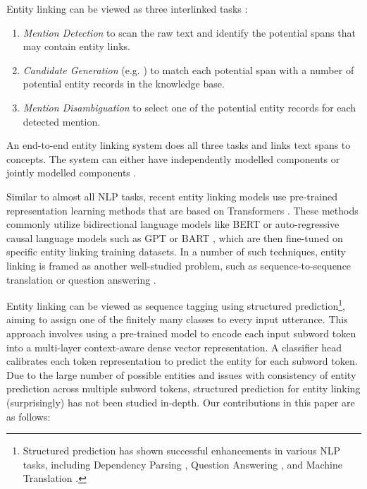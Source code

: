 \documentclass[11pt]{article}
\begin{document}
\noindent Entity linking can be viewed as three interlinked tasks \citep{K19-1063,2020.findings-emnlp.71, REL_EL}:
\begin{enumerate}
    \vspace{-0.5em}
    \itemsep0em 
    \item[(1)] \textit{Mention Detection} \cite{NER_SURVEY} to scan the raw text and identify the potential spans that may contain entity links.
    \item[(2)] \textit{Candidate Generation} (e.g. \citealp{fang2020high}) to match each potential span with a number of potential entity records in the knowledge base.
    \item[(3)] \textit{Mention Disambiguation} \cite{P11-1138, 2022.naacl-main.238} to select one of the potential entity records for each detected mention.
    \vspace{-0.5cm}
\end{enumerate}



\noindent An end-to-end entity linking system does all three tasks and links text spans to concepts. The system can either have independently modelled components \citep{TagmeToWAT, REL_EL} or jointly modelled components \citep{K18-1050,2021.emnlp-main.604}. 

Similar to almost all NLP tasks, recent entity linking models use pre-trained representation learning methods that are based on Transformers \cite{Transformer}. These methods commonly utilize bidirectional language models like BERT \cite{N19-1423} or auto-regressive causal language models such as GPT \cite{GPT3} or BART \cite{BART}, which are then fine-tuned on specific entity linking training datasets. In a number of such techniques, entity linking is framed as another well-studied problem, such as sequence-to-sequence translation \cite{GENRE} or question answering \cite{EntQA}.

Entity linking can be viewed as sequence tagging using structured prediction\footnote{Structured prediction has shown successful enhancements in various NLP tasks, including Dependency Parsing \cite{P15-1117}, Question Answering \cite{2020.emnlp-main.248}, and Machine Translation \cite{2021.eacl-main.241}.}, aiming to assign one of the finitely many classes to every input utterance. 
This approach involves using a pre-trained model to encode each input subword token into a multi-layer context-aware dense vector representation. A classifier head calibrates each token representation to predict the entity for each subword token.
Due to the large number of possible entities and issues with consistency of entity prediction across multiple subword tokens, structured prediction for entity linking (surprisingly) has not been studied in-depth. Our contributions in this paper are as follows:
\end{document}
